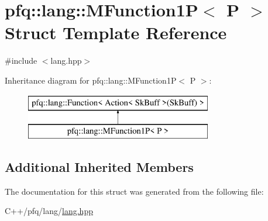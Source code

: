 \hypertarget{structpfq_1_1lang_1_1MFunction1P}{\section{pfq\+:\+:lang\+:\+:M\+Function1\+P$<$ P $>$ Struct Template Reference}
\label{structpfq_1_1lang_1_1MFunction1P}
}


{\ttfamily \#include $<$lang.\+hpp$>$}

Inheritance diagram for pfq\+:\+:lang\+:\+:M\+Function1\+P$<$ P $>$\+:\begin{figure}[H]
\begin{center}
\leavevmode
\includegraphics[height=2.000000cm]{structpfq_1_1lang_1_1MFunction1P}
\end{center}
\end{figure}
\subsection*{Additional Inherited Members}


The documentation for this struct was generated from the following file\+:\begin{DoxyCompactItemize}
\item 
C++/pfq/lang/\hyperlink{lang_8hpp}{lang.\+hpp}\end{DoxyCompactItemize}
